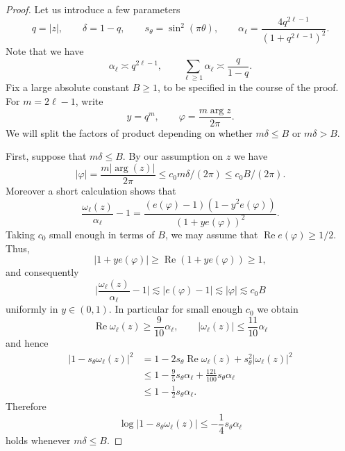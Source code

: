 \documentclass{article}
\theoremstyle{plain}
\numberwithin{equation}{section}
\begin{document}
\begin{proof}
Let us introduce a few parameters
\begin{equation*}
    q=|z|,
    \qquad
    \delta=1-q,
    \qquad
    s_\theta=\sin^2(\pi \theta), \qquad \alpha_\ell
    =
    \frac{4q^{2\ell-1}}{(1+q^{2\ell-1})^2}.
\end{equation*}
Note that we have
\begin{equation}
    \alpha_\ell \asymp q^{2\ell-1}, \qquad
    \sum_{\ell\geq1}\alpha_\ell \asymp
    \frac{q}{1-q}.
    \label{eq:alpha-total}
\end{equation}
Fix a large absolute constant $B \ge 1$, to be specified in the course of the proof. For $m=2\ell-1$, write 
\begin{equation*}
    y=q^m,
    \qquad
    \varphi=\frac{m\arg z}{2 \pi}.
\end{equation*}
We will split the factors of product depending on whether \(m\delta\leq B\) or \(m\delta>B\).

First, suppose that $m \delta \le B$. By our assumption on $z$ we have
\begin{equation*}
    |\varphi|=\frac{m|\arg(z)|}{2 \pi} \le c_0 m \delta/(2\pi) \le c_0B/(2\pi).
\end{equation*}
Moreover a short calculation shows that 
\begin{equation*}
    \frac{\omega_\ell(z)}{\alpha_\ell}-1=
    \frac{( e(\varphi)-1)(1-y^2e(\varphi))}{(1+ye(\varphi))^2}.
\end{equation*}
Taking $c_0$ small enough in terms of $B$, we may assume that
$\operatorname{Re}e(\varphi)\geq1/2$. Thus, 
\[
 |1+ye(\varphi)|\geq
 \operatorname{Re}(1+ye(\varphi))\geq1,
\]
and consequently
\begin{equation*}
    \Big|\frac{\omega_\ell(z)}{\alpha_\ell}-1 \Big| \lesssim |e(\varphi)-1|\lesssim |\varphi| \lesssim c_0B
\end{equation*}
uniformly in $y \in (0,1)$. In particular for small enough $c_0$ we obtain
\begin{equation} \label{eq: omega ell small m bound}
    \operatorname{Re}\omega_\ell(z)
    \geq
    \frac{9}{10}\alpha_\ell,
    \qquad
    |\omega_\ell(z)|
    \leq
    \frac{11}{10}\alpha_\ell
\end{equation}
and hence
\begin{align*}
    |1-s_\theta\omega_\ell(z)|^2
    &=
    1
    -2s_\theta\operatorname{Re}\omega_\ell(z)
    +s_\theta^2|\omega_\ell(z)|^2
    \\
    &\leq
    1
    -\frac95 s_\theta\alpha_\ell
    +\frac{121}{100}s_\theta\alpha_\ell
    \\
    &\leq
    1-\frac12s_\theta\alpha_\ell.
\end{align*}
Therefore
\begin{equation}
    \log|1-s_\theta\omega_\ell(z)|
    \leq
    -\frac14s_\theta\alpha_\ell
    \label{eq:main-factor}
\end{equation}
holds whenever $m\delta\leq B$.


\end{proof}
\end{document}
